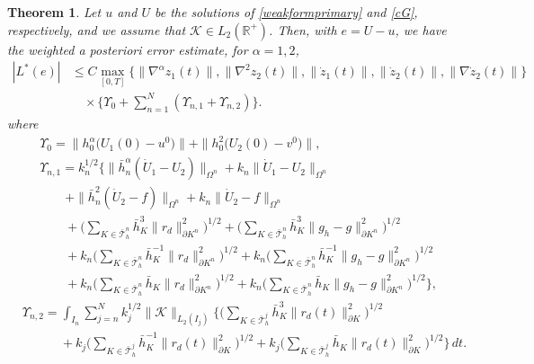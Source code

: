 \documentclass{amsart}
\numberwithin{equation}{section}
\newtheorem{theorem}{Theorem}
\theoremstyle{definition}
\begin{document}
\begin{theorem}
Let $u$ and $U$ be the solutions of \eqref{weakformprimary} 
and \eqref{cG}, respectively, and we assume that ${\mathcal K} \in L_2(\mathbb{R}^+)$.
Then, with $e=U-u$, we have the weighted a posteriori error estimate, 
for $\alpha=1,2$,
\begin{equation}   \label{aposteriori:estimate2}
  \begin{split}
    | L^*(e)| 
    &\leq C 
     \max_{[0,T]}
     \big\{\|\nabla^{\alpha}z_1(t)\|,\|\nabla^{2}z_2(t)\|,
     \|\dot z_1(t)\|,\|\dot z_2(t)\|,
     \|\nabla\dot z_2(t)\|\big\}\\
    &\quad 
     \times \Big\{\Upsilon_0 + \sum_{n=1}^N (\Upsilon_{n,1}+\Upsilon_{n,2})\Big\}.
  \end{split}
\end{equation}
where
\begin{equation*}  
  \begin{split}
    &\Upsilon_0
    =\|h_0^\alpha \big(U_1(0)-u^0\big)\| + \|h_0^2\big(U_2(0)-v^0\big)\|,\\
    
   &\Upsilon_{n,1}
    =k_n^{1/2}
     \bigg\{
     \|\bar h_n^\alpha(\dot U_1-U_2)\|_{\Omega^n}
    +k_n\|\dot U_1-U_2\|_{\Omega^n}\\
   &\quad\quad
    +\|\bar h_n^2(\dot U_2-f)\|_{\Omega^n}
     +k_n\|\dot U_2-f\|_{\Omega^n}\\
    &\quad\quad
      +\Big(\sum_{K\in\bar{\mathcal T}_h^n}\bar h_K^3\|r_d\|_{\partial K^n}^2
    \Big)^{1/2}
     +\Big(\sum_{K\in\bar{\mathcal T}_h^n}
     \bar h_K^3\|g_h-g\|_{\partial K^n}^2
    \Big)^{1/2}\\
    &\quad\quad
     +k_n 
    \Big(\sum_{K\in\bar{\mathcal T}_h^n}\bar h_K^{-1}\|r_d\|_{\partial K^n}^2
    \Big)^{1/2}
    +k_n\Big(\sum_{K\in\bar{\mathcal T}_h^n}\bar h_K^{-1}
    \|g_h-g\|_{\partial K^n}^2
    \Big)^{1/2}\\
    &\quad\quad 
    +k_n
    \Big(\sum_{K\in\bar{\mathcal T}_h^n}\bar h_K\|r_d\|_{\partial K^n}^2
    \Big)^{1/2}
    +k_n
    \Big(\sum_{K\in\bar{\mathcal T}_h^n}\bar h_K\|g_h-g\|_{\partial K^n}^2
    \Big)^{1/2}\bigg\},
  \end{split}
\end{equation*}
\begin{equation*}  
  \begin{split}
    &\Upsilon_{n,2}
     =\int_{I_n}\sum_{j=n}^N
      k_j^{1/2}\|{\mathcal K}\|_{L_2(I_j)} 
   
       \bigg\{
       \Big(\sum_{K\in\bar{\mathcal T}_h^j}\bar h_K^3 \|r_d(t)\|_{\partial K}^2\Big)^{1/2} \\
   &\quad\quad\quad    
       +k_j\Big(\sum_{K\in\bar{\mathcal T}_h^j}\bar h_K^{-1} 
          \|r_d(t)\|_{\partial K}^2\Big)^{1/2}
       +k_j\Big(\sum_{K\in\bar{\mathcal T}_h^j}
          \bar h_K \|r_d(t)\|_{\partial K}^2\Big)^{1/2}       
       \bigg\}\,dt.
  \end{split}
\end{equation*}
\end{theorem}
\end{document}
